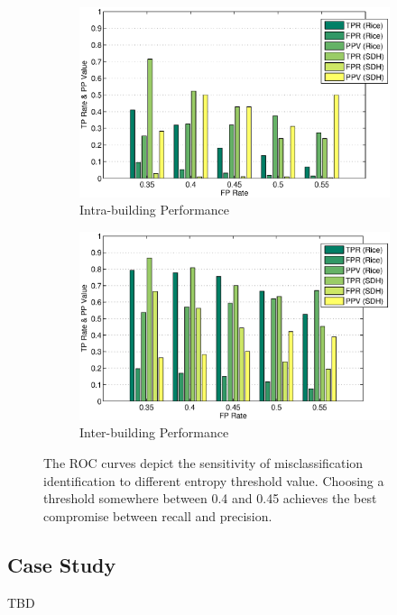 \begin{figure}[ht!]
\centering
	\begin{subfigure}{0.48\textwidth}
                \centering
		\includegraphics[width=\textwidth]{./fig/roc_intra.eps}
                \caption{Intra-building Performance}
                \label{fig:roc_intra}
	\end{subfigure}
	\begin{subfigure}{0.48\textwidth}
                \centering
		\includegraphics[width=\textwidth]{./fig/roc_inter.eps}
                \caption{Inter-building Performance}
                \label{fig:roc_inter}
	\end{subfigure}
\caption{The ROC curves depict the sensitivity of misclassification identification to different entropy threshold value. Choosing a threshold somewhere between 0.4 and 0.45 achieves the best compromise between recall and precision. }
\label{fig:roc}
\end{figure}

\subsection{Case Study}
TBD
